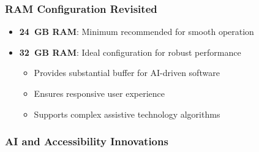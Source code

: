 \subsubsection{RAM Configuration Revisited}

\begin{itemize}
	\item \textbf{24~GB RAM}: Minimum recommended for smooth operation \supercite{EducationalEquityReport2024}
	\item \textbf{32~GB RAM}: Ideal configuration for robust performance \supercite{EducationalEquityReport2024}

	      \begin{itemize}
		      \item Provides substantial buffer for AI-driven software \supercite{AIinAccessibility}
		      \item Ensures responsive user experience \supercite{EducationalEquityReport2024}
		      \item Supports complex assistive technology algorithms \supercite{AIinAccessibility}
	      \end{itemize}

\end{itemize}



\subsubsection{AI and Accessibility Innovations}

